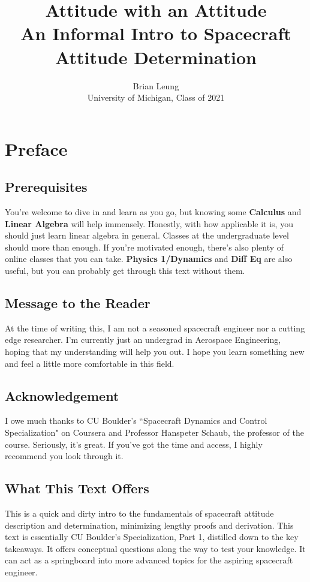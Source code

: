 \documentclass[a4paper,14pt]{extreport}
\title{Attitude with an Attitude \\
\large An Informal Intro to Spacecraft Attitude Determination}
\author{Brian Leung\\University of Michigan, Class of 2021}
\begin{document}
\maketitle
\setcounter{tocdepth}{0}
\tableofcontents{}
\chapter{Preface}
\section{Prerequisites}
You're welcome to dive in and learn as you go, but knowing some \textbf{Calculus} and \textbf{Linear Algebra} will help immensely. Honestly, with how applicable it is, you should just learn linear algebra in general. Classes at the undergraduate level should more than enough. If you're motivated enough, there's also plenty of online classes that you can take. \textbf{Physics 1/Dynamics} and \textbf{Diff Eq} are also useful, but you can probably get through this text without them.

\section{Message to the Reader}
At the time of writing this, I am not a seasoned spacecraft engineer nor a cutting edge researcher. I'm currently just an undergrad in Aerospace Engineering, hoping that my understanding will help you out. I hope you learn something new and feel a little more comfortable in this field.

\section{Acknowledgement}
I owe much thanks to CU Boulder's ``Spacecraft Dynamics and Control Specialization" on Coursera and Professor Hanspeter Schaub, the professor of the course. Seriously, it's great. If you've got the time and access, I highly recommend you look through it.

\section{What This Text Offers} 
This is a quick and dirty intro to the fundamentals of spacecraft attitude description and determination, minimizing lengthy proofs and derivation. This text is essentially CU Boulder's Specialization, Part 1, distilled down to the key takeaways. It offers conceptual questions along the way to test your knowledge. It can act as a springboard into more advanced topics for the aspiring spacecraft engineer.
\end{document}
